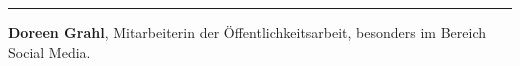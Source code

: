\begin{center}\rule{0.5\linewidth}{\linethickness}\end{center}

\textbf{Doreen Grahl}, Mitarbeiterin der Öffentlichkeitsarbeit,
besonders im Bereich Social Media.
